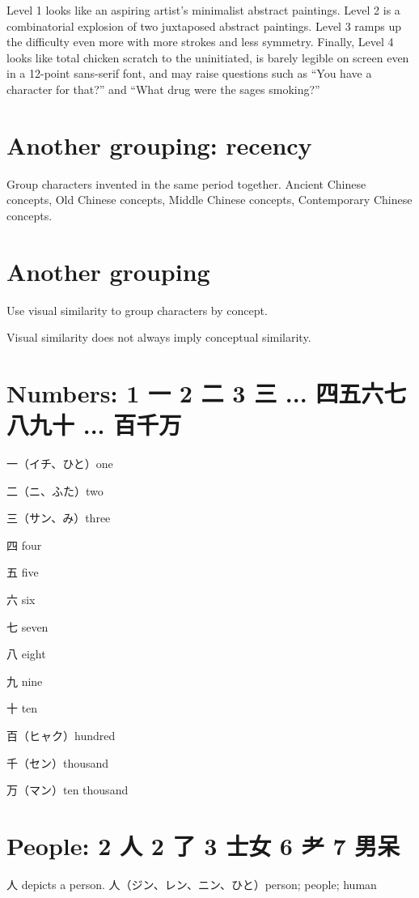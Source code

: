 Level 1 looks like
an aspiring artist's minimalist abstract paintings.
Level 2 is a combinatorial explosion
of two juxtaposed abstract paintings.
Level 3 ramps up the difficulty even more with more strokes and less symmetry.
Finally, Level 4 looks like total chicken scratch to the uninitiated,
is barely legible on screen even in a 12-point sans-serif font,
and may raise questions such as
``You have a character for that?''
and
``What drug were the sages smoking?''

\section{Another grouping: recency}

Group characters invented in the same period together.
Ancient Chinese concepts,
Old Chinese concepts,
Middle Chinese concepts,
Contemporary Chinese concepts.

\section{Another grouping}

Use visual similarity to group characters by concept.

Visual similarity does not always imply conceptual similarity.

\section{Numbers: 1 一 2 二 3 三 ... 四五六七八九十 ... 百千万}

一（イチ、ひと）one

二（ニ、ふた）two

三（サン、み）three

四 four

五 five

六 six

七 seven

八 eight

九 nine

十 ten

百（ヒャク）hundred

千（セン）thousand

万（マン）ten thousand

\section{People: 2 人 2 了 3 士女 6 耂 7 男呆}

人 depicts a person.
人（ジン、レン、ニン、ひと）person; people; human

